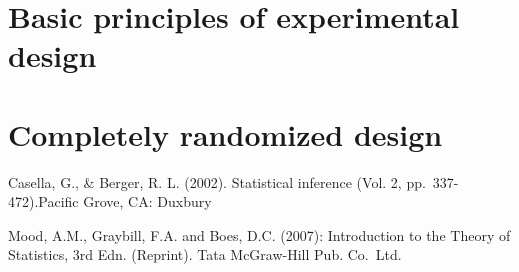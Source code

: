 \documentclass[]{book}
\begin{document}
\hypertarget{basic-principles-of-experimental-design}{%
\section{Basic principles of experimental design}\label{basic-principles-of-experimental-design}}

\hypertarget{completely-randomized-design}{%
\section{Completely randomized design}\label{completely-randomized-design}}

Casella, G., \& Berger, R. L. (2002). Statistical inference (Vol. 2, pp.~337-472).Pacific Grove, CA: Duxbury

Mood, A.M., Graybill, F.A. and Boes, D.C. (2007): Introduction to the Theory of Statistics, 3rd Edn. (Reprint). Tata McGraw-Hill Pub. Co.~Ltd.


\end{document}

